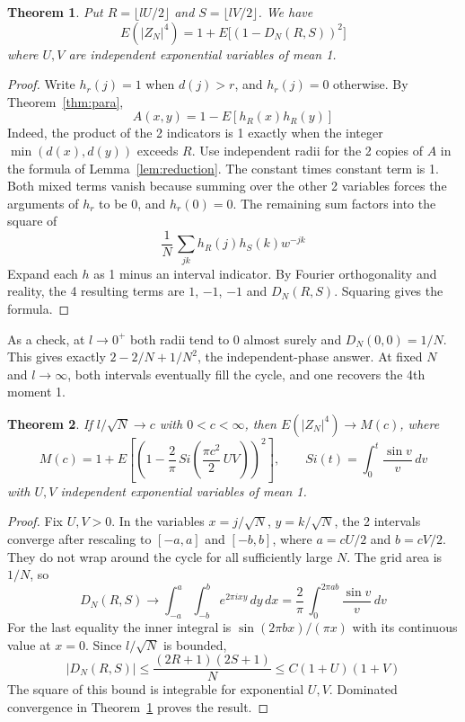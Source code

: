 \documentclass[11pt,a4paper]{article}
\newtheorem{thm}{Theorem}[section]
\theoremstyle{remark}
\begin{document}
\begin{samepage}
\begin{thm}\label{thm:finite}
Put $R=\lfloor l U/2\rfloor$ and $S=\lfloor l V/2\rfloor$. We have
\[
        E(|Z_N|^4)=1+E\big[(1-D_N(R,S))^2\big]
\]
where $U,V$ are independent exponential variables of mean 1.
\end{thm}
\end{samepage}
\begin{proof}
Write $h_r(j)=1$ when $d(j)>r$, and $h_r(j)=0$ otherwise. By Theorem~\ref{thm:para},
\[
  A(x,y)=1-E[h_R(x)h_R(y)]
\]
Indeed, the product of the 2 indicators is 1 exactly when the
integer $\min(d(x),d(y))$ exceeds $R$. Use independent radii for the 2
copies of $A$ in the formula of Lemma~\ref{lem:reduction}. The constant times constant term is
1. Both mixed terms vanish because summing over the other 2 variables
forces the arguments of $h_r$ to be 0, and $h_r(0)=0$. The remaining
sum factors into the square of
\[
  \frac1N\,\sum_{jk}h_R(j)h_S(k)w^{-jk}
\]
Expand each $h$ as 1 minus an interval indicator. By Fourier orthogonality
and reality, the 4 resulting terms are $1$, $-1$, $-1$ and $D_N(R,S)$.
Squaring gives the formula.
\end{proof}

As a check, at $l\to0^+$ both radii tend to 0 almost surely and
$D_N(0,0)=1/N$. This gives exactly $2-2/N+1/N^2$, the independent-phase
answer. At fixed $N$ and $l\to\infty$, both intervals eventually fill
the cycle, and one recovers the 4th moment 1.

\begin{samepage}
\begin{thm}\label{thm:critical}
If $l/\sqrt N\to c$ with $0<c<\infty$, then $E(|Z_N|^4)\to M(c)$, where
\[
 M(c)=1+E\left[
   \left(1-\frac2\pi\, Si\!\left(\frac{\pi c^2}2\,UV\right)\right)^2
 \right],\qquad
 Si(t)=\int_0^t\frac{\sin v}{v}\,dv
\]
with $U,V$ independent exponential variables of mean 1.
\end{thm}
\end{samepage}
\begin{proof}
Fix $U,V>0$. In the variables $x=j/\sqrt N$, $y=k/\sqrt N$, the 2
intervals converge after rescaling to $[-a,a]$ and $[-b,b]$, where
$a=cU/2$ and $b=cV/2$. They do not wrap around the cycle for all
sufficiently large $N$. The grid area is $1/N$, so
\[
 D_N(R,S)\to
 \int_{-a}^a\int_{-b}^b e^{2\pi ixy}\,dy\,dx
 =\frac2\pi\,\int_0^{2\pi ab}\frac{\sin v}{v}\,dv
\]
For the last equality the inner integral is $\sin(2\pi bx)/(\pi x)$
with its continuous value at $x=0$. Since $l/\sqrt N$ is bounded,
\[
 |D_N(R,S)|\le\frac{(2R+1)(2S+1)}{N}\le C(1+U)(1+V)
\]
The square of this bound is integrable for exponential $U,V$. Dominated
convergence in Theorem~\ref{thm:finite} proves the result.
\end{proof}
\end{document}
